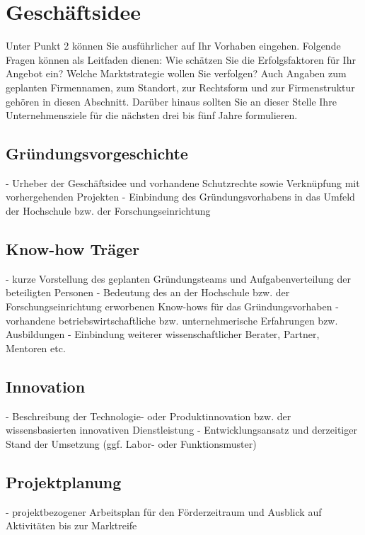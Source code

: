 \section{Geschäftsidee}


Unter Punkt 2 können Sie ausführlicher auf Ihr Vorhaben eingehen. Folgende Fragen können als Leitfaden dienen: Wie schätzen Sie die Erfolgsfaktoren für Ihr Angebot ein? Welche Marktstrategie wollen Sie verfolgen? Auch Angaben zum geplanten Firmennamen, zum Standort, zur Rechtsform und zur Firmenstruktur gehören in diesen Abschnitt. Darüber hinaus sollten Sie an dieser Stelle Ihre Unternehmensziele für die nächsten drei bis fünf Jahre formulieren.



\subsection{Gründungsvorgeschichte}

- Urheber der Geschäftsidee und vorhandene Schutzrechte sowie Verknüpfung mit vorhergehenden Projekten
- Einbindung des Gründungsvorhabens in das Umfeld der Hochschule bzw. der Forschungseinrichtung 

\subsection{Know-how Träger}
- kurze Vorstellung des geplanten Gründungsteams und Aufgabenverteilung der beteiligten Personen
- Bedeutung des an der Hochschule bzw. der Forschungseinrichtung erworbenen Know-hows für das   
  Gründungsvorhaben
- vorhandene betriebswirtschaftliche bzw. unternehmerische Erfahrungen bzw. Ausbildungen
- Einbindung weiterer wissenschaftlicher Berater, Partner, Mentoren etc.
\subsection{Innovation}
- Beschreibung der Technologie- oder Produktinnovation bzw. der wissensbasierten innovativen Dienstleistung
- Entwicklungsansatz und derzeitiger Stand der Umsetzung (ggf. Labor- oder Funktionsmuster)

\subsection{Projektplanung}
- projektbezogener Arbeitsplan für den Förderzeitraum und Ausblick auf Aktivitäten bis zur Marktreife



